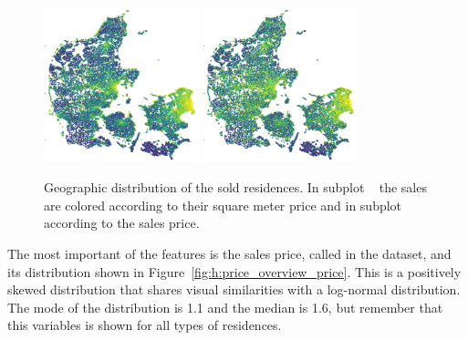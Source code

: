 \begin{figure}
  \centering
  \subfloat[\label{fig:h:geo_overview_sqm_price}]{\qquad}
  \includegraphics[draft=false, width=0.4\textwidth]{figures/housing/Denmark_Overview_SqmPrice.png}\hfil
  \subfloat[\label{fig:h:geo_overview_sales_price}]{\qquad}
  \includegraphics[draft=false, width=0.4\textwidth]{figures/housing/Denmark_Overview_SalesPrice.png}
  \caption[Distributions for the housing price dataset]{Geographic distribution of the sold residences. 
           In subplot ~\protect{} the sales are colored according to their square meter price and in subplot ~\protect{} according to the sales price. 
           }
  \label{fig:h:geo_overview}
  \vspace{\abovecaptionskip}
\end{figure}


The most important of the features is the sales price, called  in the dataset, and its distribution shown in Figure~\ref{fig:h:price_overview_price}. This is a positively skewed distribution that shares visual similarities with a log-normal distribution. The mode of the distribution is \SI{1.1}{\Mkr} and the median is \SI{1.6}{\Mkr}, but remember that this variables is shown for all types of residences.  

